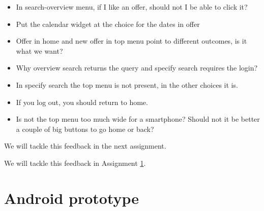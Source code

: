 \documentclass[11pt,twoside,a4paper]{report}
\begin{document}
\begin{itemize}

\item In search-overview menu, if I like an offer, should not I be able to click it?

\item Put the calendar widget at the choice for the dates in offer

\item Offer in home and new offer in top menu point to different outcomes, is it what we want?

\item Why overview search returns the query and specify search requires the login?

\item In specify search the top menu is not present, in the other choices it is.

\item If you log out, you should return to home.

\item Is not the top menu too much wide for a smartphone? Should not it be better a couple of big buttons to go home or back?

\end{itemize}

We will tackle this feedback in the next assignment.

We will tackle this feedback in Assignment \ref{assignment:android-prototype}.

\chapter{Android prototype}
\label{assignment:android-prototype}
\end{document}
